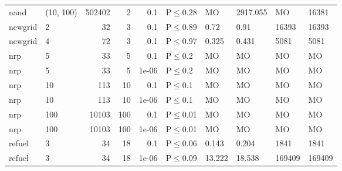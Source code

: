 \begin{longtable}{llrrrlllll}
 nand          & (10, 100) & 	502402 &   2 & 0.1   & P$\leq$0.28  & MO      & 2917.055 & MO     & 16381   \\
 newgrid       & 2         &     	32 &   3 & 0.1   & P$\leq$0.89  & 0.72    & 0.91     & 16393  & 16393   \\
 newgrid       & 4         &     	72 &   3 & 0.1   & P$\leq$0.97  & 0.325   & 0.431    & 5081   & 5081    \\
 nrp           & 5         &     	33 &   5 & 0.1   & P$\leq$0.2   & MO      & MO       & MO     & MO      \\
 nrp           & 5         &     	33 &   5 & 1e-06 & P$\leq$0.2   & MO      & MO       & MO     & MO      \\
 nrp           & 10        &    	113 &  10 & 0.1   & P$\leq$0.1   & MO      & MO       & MO     & MO      \\
 nrp           & 10        &    	113 &  10 & 1e-06 & P$\leq$0.1   & MO      & MO       & MO     & MO      \\
 nrp           & 100       &  	10103 & 100 & 0.1   & P$\leq$0.01  & MO      & MO       & MO     & MO      \\
 nrp           & 100       &  	10103 & 100 & 1e-06 & P$\leq$0.01  & MO      & MO       & MO     & MO      \\
 refuel        & 3         &     	34 &  18 & 0.1   & P$\leq$0.06  & 0.143   & 0.204    & 1841   & 1841    \\
 refuel        & 3         &     	34 &  18 & 1e-06 & P$\leq$0.09  & 13.222  & 18.538   & 169409 & 169409  \\
\bottomrule
\end{longtable}
